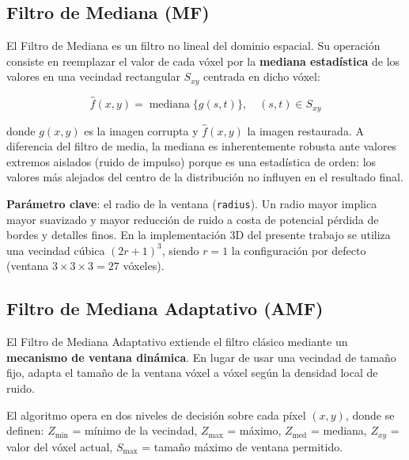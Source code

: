 \documentclass[12pt, a4paper]{article}
\begin{document}
\subsection{Filtro de Mediana (MF)}

El Filtro de Mediana es un filtro no lineal del dominio espacial. Su operación consiste en
reemplazar el valor de cada vóxel por la \textbf{mediana estadística} de los valores en
una vecindad rectangular $S_{xy}$ centrada en dicho vóxel:

\begin{equation}
  \hat{f}(x,y) = \operatorname{mediana}\bigl\{g(s,t)\bigr\},\quad (s,t) \in S_{xy}
  \label{eq:median}
\end{equation}

donde $g(x,y)$ es la imagen corrupta y $\hat{f}(x,y)$ la imagen restaurada. A diferencia
del filtro de media, la mediana es inherentemente robusta ante valores extremos aislados
(ruido de impulso) porque es una estadística de orden: los valores más alejados del centro
de la distribución no influyen en el resultado final.

\textbf{Parámetro clave}: el radio de la ventana (\texttt{radius}). Un radio mayor implica
mayor suavizado y mayor reducción de ruido a costa de potencial pérdida de bordes y
detalles finos. En la implementación 3D del presente trabajo se utiliza una vecindad cúbica
$(2r+1)^3$, siendo $r=1$ la configuración por defecto (ventana $3\times3\times3 = 27$
vóxeles).

\subsection{Filtro de Mediana Adaptativo (AMF)}

El Filtro de Mediana Adaptativo \cite{lin2013} extiende el filtro clásico mediante un
\textbf{mecanismo de ventana dinámica}. En lugar de usar una vecindad de tamaño fijo,
adapta el tamaño de la ventana vóxel a vóxel según la densidad local de ruido.

El algoritmo opera en dos niveles de decisión sobre cada píxel $(x,y)$, donde se definen:
$Z_{\min}$ = mínimo de la vecindad, $Z_{\max}$ = máximo, $Z_{\text{med}}$ = mediana,
$Z_{xy}$ = valor del vóxel actual, $S_{\max}$ = tamaño máximo de ventana permitido.
\end{document}
